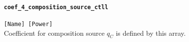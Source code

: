 \paragraph{\tt coef\_4\_composition\_source\_ctll}
\label{href_t:coef_4_composition_source_ctl}
\verb|[Name] [Power]| \\
Coefficient for composition source $\displaystyle q_{C}$ is defined by this array.

%
%
%

